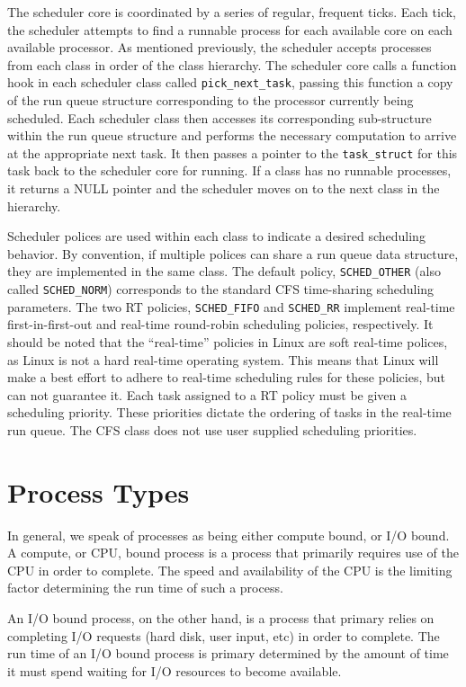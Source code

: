 \documentclass[12pt]{article}
\begin{document}
The scheduler core is coordinated by a series of regular,
frequent ticks. Each tick, the scheduler attempts to find a runnable
process for each available core on each available processor. As
mentioned previously, the scheduler accepts processes from each class
in order of the class hierarchy. The scheduler core calls a function
hook in each scheduler class called \texttt{pick\_next\_task}, passing
this function a copy of the run queue structure corresponding to the
processor currently being scheduled. Each scheduler class then accesses its
corresponding sub-structure within the run queue structure and performs
the necessary computation to arrive at the appropriate next task. It then
passes a pointer to the \texttt{task\_struct} for this task back to the
scheduler core for
running. If a class has no runnable processes, it returns a NULL
pointer and the scheduler moves on to the next class in the hierarchy.

Scheduler polices are used within each class to indicate a desired
scheduling behavior. By convention, if multiple polices can share a run
queue data structure, they are implemented in the same class. The
default policy, \texttt{SCHED\_OTHER} (also called
\texttt{SCHED\_NORM}) corresponds to the standard CFS time-sharing
scheduling parameters. The two RT policies, \texttt{SCHED\_FIFO} and
\texttt{SCHED\_RR} implement real-time first-in-first-out and real-time
round-robin scheduling policies, respectively. It should be noted that
the ``real-time'' policies in Linux are soft real-time polices, as
Linux is not a hard real-time operating system. This means that Linux
will make a best effort to adhere to real-time scheduling rules for
these policies, but can not guarantee it. Each task assigned to a RT
policy must be given a scheduling priority. These priorities dictate the
ordering of tasks in the real-time run queue. The CFS class does not
use user supplied scheduling priorities.

\section{Process Types}

In general, we speak of processes as being either compute bound, or
I/O bound. A compute, or CPU, bound process is a process that primarily
requires use of the CPU in order to complete. The speed and availability
of the CPU is the limiting
factor determining the run time of such a process.

An I/O bound process, on the other hand, is a process that
primary relies on completing I/O requests (hard disk, user input, etc)
in order to complete. The run time of an I/O bound process is primary
determined by the amount of time it must spend waiting for I/O
resources to become available.
\end{document}
